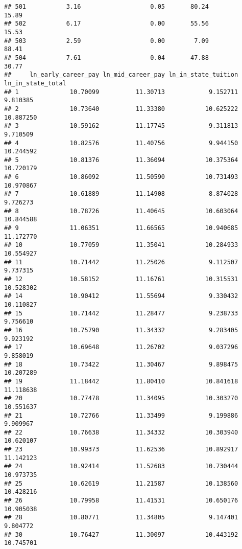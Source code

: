\documentclass[
]{article}
\begin{document}
\begin{verbatim}
## 501           3.16                   0.05       80.24          15.89
## 502           6.17                   0.00       55.56          15.53
## 503           2.59                   0.00        7.09          88.41
## 504           7.61                   0.04       47.88          30.77
##     ln_early_career_pay ln_mid_career_pay ln_in_state_tuition ln_in_state_total
## 1              10.70099          11.30713            9.152711          9.810385
## 2              10.73640          11.33380           10.625222         10.887250
## 3              10.59162          11.17745            9.311813          9.710509
## 4              10.82576          11.40756            9.944150         10.244592
## 5              10.81376          11.36094           10.375364         10.720179
## 6              10.86092          11.50590           10.731493         10.970867
## 7              10.61889          11.14908            8.874028          9.726273
## 8              10.78726          11.40645           10.603064         10.844588
## 9              11.06351          11.66565           10.940685         11.172770
## 10             10.77059          11.35041           10.284933         10.554927
## 11             10.71442          11.25026            9.112507          9.737315
## 12             10.58152          11.16761           10.315531         10.528302
## 14             10.90412          11.55694            9.330432         10.110827
## 15             10.71442          11.28477            9.238733          9.756610
## 16             10.75790          11.34332            9.283405          9.923192
## 17             10.69648          11.26702            9.037296          9.858019
## 18             10.73422          11.30467            9.898475         10.207289
## 19             11.18442          11.80410           10.841618         11.118638
## 20             10.77478          11.34095           10.303270         10.551637
## 21             10.72766          11.33499            9.199886          9.909967
## 22             10.76638          11.34332           10.303940         10.620107
## 23             10.99373          11.62536           10.892917         11.142123
## 24             10.92414          11.52683           10.730444         10.973735
## 25             10.62619          11.21587           10.138560         10.428216
## 26             10.79958          11.41531           10.650176         10.905038
## 28             10.80771          11.34805            9.147401          9.804772
## 30             10.76427          11.30097           10.443192         10.745701

\end{verbatim}
\end{document}
